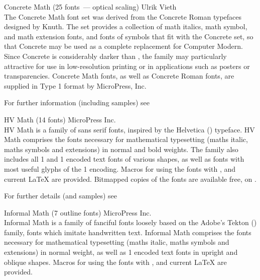 \begin{booklist}
\item[Concrete Math](25 fonts~--- optical scaling) Ulrik Vieth\\
  The Concrete Math font set was derived from the Concrete Roman
  typefaces designed by Knuth.  The set provides a collection of math
  italics, math symbol, and math extension fonts, and fonts of
   symbols that fit with the Concrete set, so that Concrete
  may be used as a complete replacement for Computer Modern.  Since
  Concrete is considerably darker than , the family may
  particularly attractive for use in low-resolution printing or in
  applications such as posters or transparencies.  Concrete Math
  fonts, as well as Concrete Roman fonts, are supplied in Type 1
  format by MicroPress, Inc.

  \nothtml{\bgroup\raggedwithindent}
  For further information (including samples) see\\
  \nothtml{\par\egroup}

\item[HV Math](14 fonts) MicroPress Inc.\\
  HV Math is a family of sans serif fonts, inspired by the
  Helvetica () typeface.  HV Math comprises the fonts
  necessary for mathematical typesetting (maths italic, maths symbols
  and extensions) in normal and bold weights.  The family also
  includes all 1 and 1 encoded text fonts of various
  shapes, as well as fonts with most useful glyphs of the 1
  encoding.  Macros for using the fonts with \plaintex{}, \LaTeXo{}
  and current \LaTeX{} are provided.  Bitmapped copies of the fonts
  are available free, on .

  \nothtml{\bgroup\raggedwithindent}
  For further details (and samples) see\\
  \nothtml{\par\egroup}

\item[Informal Math](7 outline fonts) MicroPress Inc.\\
  Informal Math is a family of fanciful fonts loosely based on the
  Adobe's Tekton () family, fonts which imitate handwritten
  text.  Informal Math comprises the fonts necessary for
  mathematical typesetting (maths italic, maths symbols and extensions)
  in normal weight, as well as 1 encoded text fonts in
  upright and oblique shapes.  Macros for using the fonts with
  \plaintex{}, \LaTeXo{} and current \LaTeX{} are provided.


\end{booklist}
